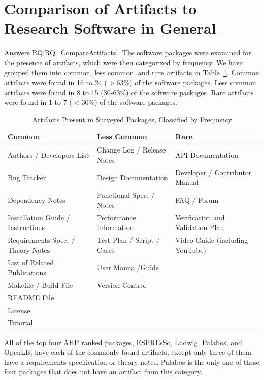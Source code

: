 \documentclass[final, 3p, times, authoryear]{elsarticle}
\newcommand{\rqref}[1]{RQ\ref{#1}}
\begin{document}
\section{Comparison of Artifacts to Research Software in General}
\label{Sec_CompareArtifacts}

Answers \rqref{RQ_CompareArtifacts}.  The software packages were examined for
the presence of artifacts, which were then categorized by frequency. We have
grouped them into common, less common, and rare artifacts in
Table~\ref{artifactspresent}. Common artifacts were found in 16 to 24 ($>$63\%)
of the software packages. Less common artifacts were found in 8 to 15 (30-63\%)
of the software packages. Rare artifacts were found in 1 to 7 ($<$30\%) of the
software packages. 

\begin{table}
\begin{center}
\begin{tabular}{ p{5.3 cm} p{4.9 cm} p{5 cm}}
\toprule
\textbf{Common} & \textbf{Less Common} & \textbf{Rare} \\
\midrule
Authors / Developers List & Change Log / Release Notes & API Documentation\\
Bug Tracker & Design Documentation & Developer / Contributor Manual\\
Dependency Notes & Functional Spec. / Notes & FAQ / Forum\\
Installation Guide / Instructions & Performance Information & Verification and
Validation Plan\\
Requirements Spec. / Theory Notes & Test Plan / Script / Cases & Video Guide
(including YouTube)\\
List of Related Publications & User Manual/Guide & \\
Makefile / Build File & Version Control & \\
README File & & \\
License & & \\
Tutorial & & \\
\bottomrule
\end{tabular}
\caption{Artifacts Present in Surveyed Packages, Classified by Frequency}
\label{artifactspresent}
\end{center}
\end{table}

All of the top four AHP ranked packages, ESPREsSo, Ludwig, Palabos, and OpenLB,
have each of the commonly found artifacts, except only three of them have a
requirements specification or theory notes. Palabos is the only one of these
four packages that does not have an artifact from this category.
\end{document}
